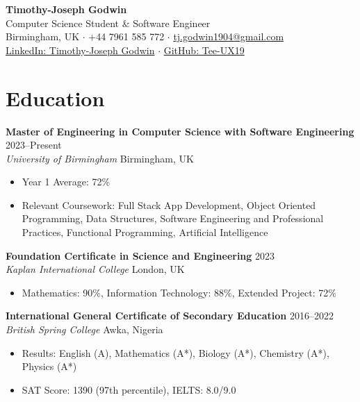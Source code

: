 \documentclass[11pt,a4paper]{article}
\newcommand{\cventry}[6]{
    \textbf{#2} \hfill #1 \\
    \textit{#3} \hfill #4 \\
    #6
    \vspace{8pt}
}
\begin{document}
\begin{center}
    {\LARGE \textbf{Timothy-Joseph Godwin}} \\
    \vspace{4pt}
    Computer Science Student \& Software Engineer \\
    \vspace{4pt}
    Birmingham, UK $\cdot$ +44 7961 585 772 $\cdot$ \href{mailto:tj.godwin1904@gmail.com}{tj.godwin1904@gmail.com} \\
    \href{https://linkedin.com/in/timothy-joseph-godwin}{LinkedIn: Timothy-Joseph Godwin} $\cdot$ \href{https://github.com/Tee-UX19}{GitHub: Tee-UX19}
\end{center}

\vspace{12pt}

\section{Education}

\cventry{2023--Present}{Master of Engineering in Computer Science with Software Engineering}{University of Birmingham}{Birmingham, UK}{Expected First Class Honours}{
    \begin{itemize}[leftmargin=20pt, noitemsep, topsep=0pt]
        \item Year 1 Average: 72\%
        \item Relevant Coursework: Full Stack App Development, Object Oriented Programming, Data Structures, Software Engineering and Professional Practices, Functional Programming, Artificial Intelligence
    \end{itemize}
}

\cventry{2023}{Foundation Certificate in Science and Engineering}{Kaplan International College}{London, UK}{}{
    \begin{itemize}[leftmargin=20pt, noitemsep, topsep=0pt]
        \item Mathematics: 90\%, Information Technology: 88\%, Extended Project: 72\%
    \end{itemize}
}

\cventry{2016--2022}{International General Certificate of Secondary Education}{British Spring College}{Awka, Nigeria}{}{
    \begin{itemize}[leftmargin=20pt, noitemsep, topsep=0pt]
        \item Results: English (A), Mathematics (A*), Biology (A*), Chemistry (A*), Physics (A*)
        \item SAT Score: 1390 (97th percentile), IELTS: 8.0/9.0
    \end{itemize}
}
\end{document}
